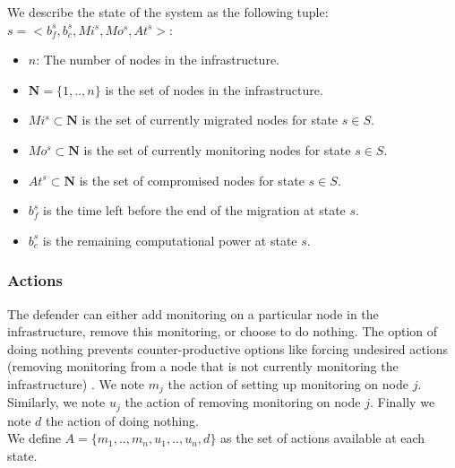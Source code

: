
We describe the state of the system as the following tuple: $s=<b_f^s,b_c^s,Mi^s,Mo^s,At^s>$: 
\begin{itemize}
    \item $n$: The number of nodes in the infrastructure.
    \item $\textbf{N} = \{1,..,n\}$ is the set of nodes in the infrastructure.
    \item $Mi^s \subset \textbf{N} $ is the set of currently migrated nodes for state $s\in S$.
    \item $Mo^s \subset \textbf{N}$ is the set of currently monitoring nodes for state $s\in S$.
    \item $At^s \subset \textbf{N}$ is the set of compromised nodes for state $s \in S$.
    \item $b_f^s$ is the time left before the end of the migration at state $s$.
    \item $b_c^s$ is the remaining computational power at state $s$.
\end{itemize}


\subsubsection{Actions}
\label{sec:actionset}
The defender can either add monitoring on a particular node in the infrastructure, remove this monitoring, or choose to do nothing.
The option of doing nothing prevents counter-productive options like forcing undesired actions (\eg removing monitoring from a node that is not currently monitoring the infrastructure) .
We note $m_j$ the action of setting up monitoring on node $j$. Similarly, we note $u_j$ the action of removing monitoring on node $j$.
Finally we note $d$ the action of doing nothing.
\\We define $A = \{m_1,..,m_n,u_1,..,u_n,d\}$ as the set of actions available at each state.

